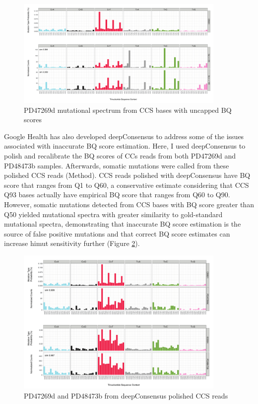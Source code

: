 \begin{figure}[htbp!]
\caption{PD47269d mutational spectrum from CCS bases with uncapped BQ scores}
\label{figure:PD47269d-ccs-uq}
\includegraphics[width=0.9\textwidth]{Vector/CB001_PD47269d_ccs_uq.pdf}
\end{figure}

Google Health has also developed deepConsensus \cite{Baid2022-or} to address some of the issues associated with inaccurate BQ score estimation. Here, I used deepConsensus to polish and recalibrate the BQ scores of CCs reads from both PD47269d and PD48473b samples. Afterwards, somatic mutations were called from these polished CCS reads (Method). CCS reads polished with deepConsensus have BQ score that ranges from Q1 to Q60, a conservative estimate considering that CCS Q93 bases actually have empirical BQ score that ranges from Q60 to Q90. However, somatic mutations detected from CCS bases with BQ score greater than Q50 yielded mutational spectra with greater similarity to gold-standard mutational spectra, demonstrating that inaccurate BQ score estimation is the source of false positive mutations and that correct BQ score estimates can increase himut sensitivity further (Figure \ref{figure:PD47269d-PD48473b-deepConsensus}). 

\begin{figure}[htbp!]
\caption{PD47269d and PD48473b from deepConsensus polished CCS reads}
\label{figure:PD47269d-PD48473b-deepConsensus}
\includegraphics[width=0.9\textwidth]{Vector/CB001_PD47269d_KX004_PD48473b_deepConsensus.pdf}
\end{figure}

